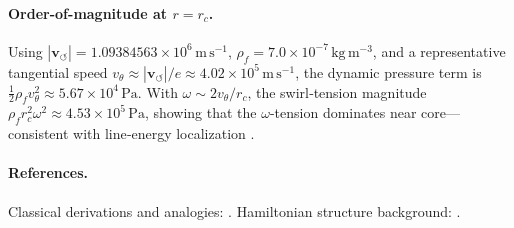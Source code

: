 \documentclass[10pt,reprint,aps,onecolumn,nofootinbib]{revtex4-2}
\begin{document}
    \paragraph{Order-of-magnitude at \(r\!=\!r_c\).}
        Using
        \(|\mathbf{v}_{\!\boldsymbol{\circlearrowleft}}|=1.09384563\times10^{6}\,\mathrm{m\,s^{-1}}\),
        \(\rho_{\!f}=7.0\times10^{-7}\,\mathrm{kg\,m^{-3}}\),
        and a representative tangential speed \(v_\theta \approx |\mathbf{v}_{\!\boldsymbol{\circlearrowleft}}|/e \approx 4.02\times10^{5}\,\mathrm{m\,s^{-1}}\),
        the dynamic pressure term is
        \(\tfrac12 \rho_{\!f}v_\theta^{2}\approx 5.67\times10^{4}\,\mathrm{Pa}\).
        With \(\omega\sim 2v_\theta/r_c\),
        the swirl‐tension magnitude \(\rho_{\!f} r_c^{2}\omega^{2}\approx 4.53\times10^{5}\,\mathrm{Pa}\),
        showing that the \(\omega\)-tension dominates near core—consistent with line‐energy localization
        \cite{Saffman1992,Batchelor1967,LandauFM}.

    \paragraph{References.}
        Classical derivations and analogies: \cite{Saffman1992,Batchelor1967,LandauFM}.
        Hamiltonian structure background: \cite{Salmon1988,Morrison1998}.

\newpage
\end{document}
